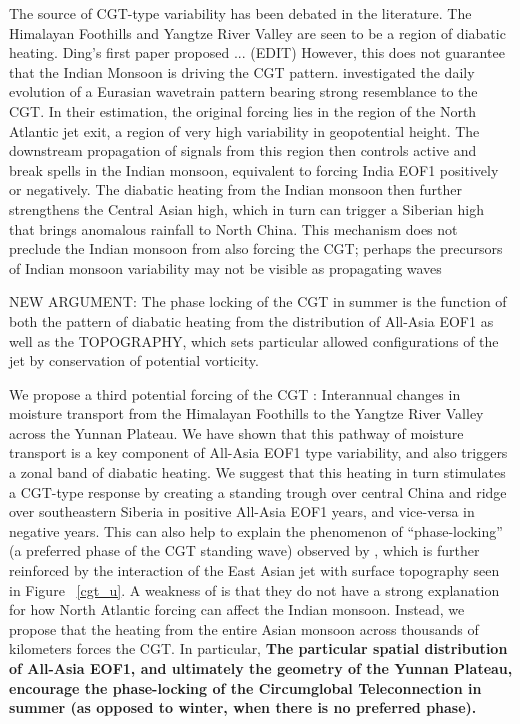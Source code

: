 	The source of CGT-type variability has been debated in the literature. The Himalayan Foothills and Yangtze River Valley are seen to be a region of diabatic heating. Ding's first paper proposed ... (EDIT) However, this does not guarantee that the Indian Monsoon is driving the CGT pattern. \citet{Ding2007} investigated the daily evolution of a Eurasian wavetrain pattern bearing strong resemblance to the CGT. In their estimation, the original forcing lies in the region of the North Atlantic jet exit, a region of very high variability in geopotential height. The downstream propagation of signals from this region then controls active and break spells in the Indian monsoon, equivalent to forcing India EOF1 positively or negatively. The diabatic heating from the Indian monsoon then further strengthens the Central Asian high, which in turn can trigger a Siberian high that brings anomalous rainfall to North China. This mechanism does not preclude the Indian monsoon from also forcing the CGT; perhaps the precursors of Indian monsoon variability may not be visible as propagating waves
		
	NEW ARGUMENT: The phase locking of the CGT in summer is the function of both the pattern of diabatic heating from the distribution of All-Asia EOF1 as well as the TOPOGRAPHY, which sets particular allowed configurations of the jet by conservation of potential vorticity.

	We propose a third potential forcing of the CGT \citet{Ding2007}: Interannual changes in moisture transport from the Himalayan Foothills to the Yangtze River Valley across the Yunnan Plateau. We have shown that this pathway of moisture transport is a key component of All-Asia EOF1 type variability, and also triggers a zonal band of diabatic heating. We suggest that this heating in turn stimulates a CGT-type response by creating a standing trough over central China and ridge over southeastern Siberia in positive All-Asia EOF1 years, and vice-versa in negative years. This can also help to explain the phenomenon of ``phase-locking'' (a preferred phase of the CGT standing wave) observed by \citet{Ding2005}, which is further reinforced by the interaction of the East Asian jet with surface topography seen in Figure ~\ref{cgt_u}. A weakness of \citet{Ding2007} is that they do not have a strong explanation for how North Atlantic forcing can affect the Indian monsoon. Instead, we propose that the heating from the entire Asian monsoon across thousands of kilometers forces the CGT. In particular, \textbf{The particular spatial distribution of All-Asia EOF1, and ultimately the geometry of the Yunnan Plateau, encourage the phase-locking of the Circumglobal Teleconnection in summer (as opposed to winter, when there is no preferred phase).} 

